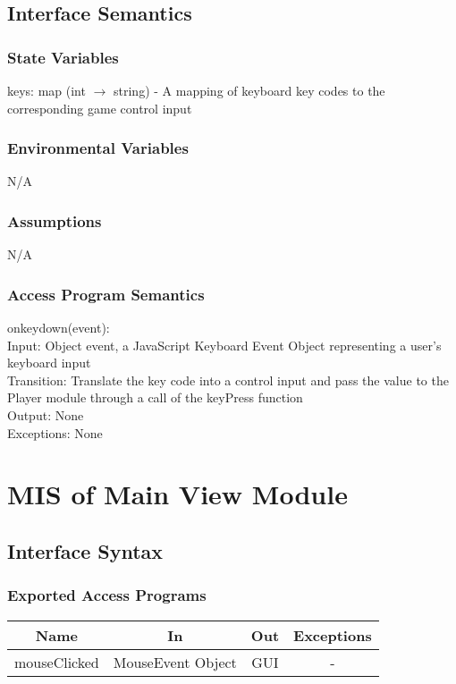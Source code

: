 \documentclass[12,english]{article}
\begin{document}
		\subsection{Interface Semantics}
		\subsubsection{State Variables}
		keys: map (int $\rightarrow$ string) - A mapping of keyboard key codes to the corresponding game control input
		
		\subsubsection{Environmental Variables}
		N/A
		
		\subsubsection{Assumptions}
		N/A
		
		\subsubsection{Access Program Semantics}
		onkeydown(event):\\
		
		Input: Object event, a JavaScript Keyboard Event Object representing a user's keyboard input\\
		
		Transition: Translate the key code into a control input and pass the value to the Player module through a call of the keyPress function \\
		
		Output: None\\
		
		Exceptions: None\\
\section{MIS of Main View Module}
		\subsection{Interface Syntax}
		\subsubsection{Exported Access Programs}
		\begin{tabular}[pos]{|c|c|c|c|}
			
			\hline
			\label{MainviewEAP}
			\textbf{Name}& \textbf{In} & \textbf{Out} & \textbf{Exceptions} \\ \hline
			mouseClicked & MouseEvent Object & GUI & -\\ \hline

			
		\end{tabular}
		
\end{document}
